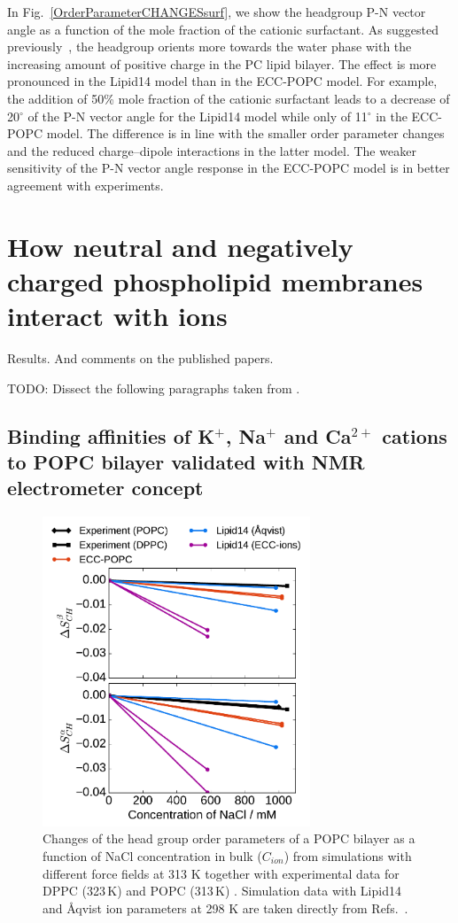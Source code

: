 In Fig.~\ref{OrderParameterCHANGESsurf}, we show the headgroup P-N vector angle as a function of the mole fraction of the cationic surfactant. As suggested previously~\citep{seelig87}, the headgroup orients more towards the water phase with the increasing amount of positive charge in the PC lipid bilayer. The effect is more pronounced in the Lipid14 model than in the ECC-POPC model.   For example, the addition of 50\% mole fraction of the cationic surfactant leads to a decrease of 20$^{\circ}$ of the P-N vector angle for the Lipid14 model while only of 11$^{\circ}$ in the ECC-POPC model. The difference is in line with the smaller order parameter changes and the reduced charge--dipole interactions in the latter model. The weaker sensitivity of the P-N vector angle response in the ECC-POPC model is in better agreement with experiments. 


\section{How neutral and negatively charged phospholipid membranes interact with ions}

  Results.
  And comments on the published papers. 

  TODO: Dissect the following paragraphs taken from \citep{melcr18}.


\subsection{Binding affinities of K$^+$, Na$^+$ and Ca$^{2+}$ cations to POPC bilayer validated with NMR electrometer concept} 
 
 
\begin{figure}[htb!] 
  \centering 
  \includegraphics[width=8.0cm]{../img/ecc_pops/OrdPars-A-B_L14-ECCL17_q80_sig89_NaCl.pdf} 
  \caption{\label{fig:delta_ordPar_NaCl} 
    Changes of the head group order parameters of a POPC bilayer as a function of NaCl concentration 
    in bulk ($C_{ion}$) from simulations with different force fields at 313 K together with  
    experimental data for DPPC (323\,K) \citep{akutsu81} and POPC (313\,K) \citep{altenbach84}. 
    Simulation data with Lipid14 and Åqvist ion parameters at 298 K are taken directly from 
    Refs.~\citep{lipid14POPC0mMNaClfiles,lipid14POPC1000mMNaClfiles}. 
  } 
\end{figure} 
 
